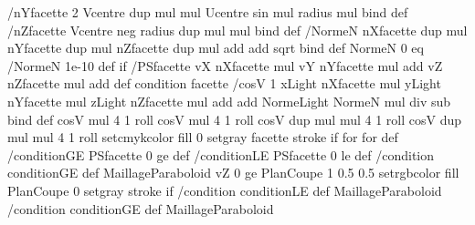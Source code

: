 {{{{{        /nYfacette {2 Vcentre dup mul mul Ucentre sin mul radius mul} bind def
        /nZfacette {Vcentre neg radius dup mul mul} bind def
        /NormeN {
          nXfacette dup mul
          nYfacette dup mul
          nZfacette dup mul
          add add sqrt} bind def
        NormeN 0 eq {/NormeN 1e-10 def} if
       /PSfacette vX nXfacette mul
                  vY nYfacette mul add
                  vZ nZfacette mul add def
       condition {
         facette
         /cosV {1 xLight nXfacette mul
           yLight nYfacette mul
           zLight nZfacette mul
           add add
           NormeLight
           NormeN mul div sub} bind def
         \psk@ThreeDplot@SegmentColor\space 
         cosV mul 4 1 roll cosV mul 4 1 roll cosV dup mul mul 4 1 roll cosV dup mul mul 4 1 roll
         setcmykcolor fill
         0 setgray
         facette
         stroke
       } if
     } for
    } for
  } def
  /conditionGE { PSfacette 0 ge } def
  /conditionLE { PSfacette 0 le } def
  \ifPstThreeDplot@showInside
    /condition { conditionGE } def
    MaillageParaboloid
    vZ 0 ge {
      PlanCoupe 1 0.5 0.5 setrgbcolor fill
      PlanCoupe 0 setgray stroke } if
  \else 
    /condition { conditionLE } def
    MaillageParaboloid
    /condition { conditionGE } def
    MaillageParaboloid
  \fi
}%
  \showpointsfalse%
  \end@SpecialObj%
\ignorespaces}
%
\def\pstThreeDSphere{\pst@object{pstSphereIIID}}
\def\pstSphereIIID@i(#1,#2,#3)#4{%
\addto@par{viewpoint=0 0 0}%
\begin@SpecialObj%
\addto@pscode{%
  /viewpoint {%
    \psk@viewpoint
    \psk@ThreeDplot@Beta\space sin add 3 1 roll
    \psk@ThreeDplot@Alpha\space cos add \psk@ThreeDplot@Beta\space cos mul 3 1 roll
    \psk@ThreeDplot@Alpha\space sin add \psk@ThreeDplot@Beta\space cos mul 3 1 roll
  } def
  0 viewpoint 0 \tx@SetMatrixThreeD
  viewpoint /vZ ED /vY ED /vX ED
  #1 \pst@number\psunit mul #2 \pst@number\psunit mul #3 \pst@number\psunit mul  
  #4 \pst@number\psunit mul
  \psk@ThreeDplot@increment\space
  /cmyk {} def   %
  \psk@ThreeDplot@SegmentColor\space 
  \psk@ThreeDplot@xyzLight\space          %
  tx@3DPlotDict begin MaillageSphere end
}%
  \showpointsfalse%
  \end@SpecialObj%
\ignorespaces}
%
